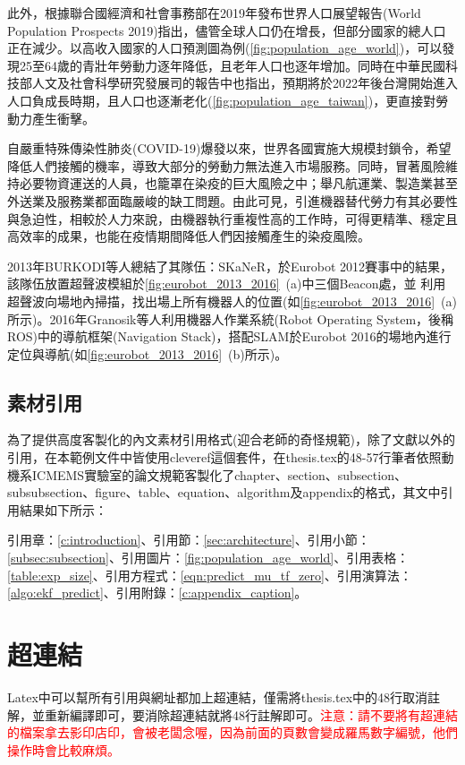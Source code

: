 此外，根據聯合國經濟和社會事務部在2019年發布世界人口展望報告(World Population Prospects 2019)\cite{nations2019world}指出，儘管全球人口仍在增長，但部分國家的總人口正在減少。以高收入國家的人口預測圖為例(\cref{fig:population_age_world})，可以發現25至64歲的青壯年勞動力逐年降低，且老年人口也逐年增加。同時在中華民國科技部人文及社會科學研究發展司的報告中也指出\cite{人文與社科簡訊_人口老化}，預期將於2022年後台灣開始進入人口負成長時期，且人口也逐漸老化(\cref{fig:population_age_taiwan})，更直接對勞動力產生衝擊。

自嚴重特殊傳染性肺炎(COVID-19)爆發以來，世界各國實施大規模封鎖令，希望降低人們接觸的機率，導致大部分的勞動力無法進入市場服務。同時，冒著風險維持必要物資運送的人員，也籠罩在染疫的巨大風險之中；舉凡航運業、製造業甚至外送業及服務業都面臨嚴峻的缺工問題。由此可見，引進機器替代勞力有其必要性與急迫性，相較於人力來說，由機器執行重複性高的工作時，可得更精準、穩定且高效率的成果，也能在疫情期間降低人們因接觸產生的染疫風險。

2013年BURKODI等人\cite{eurobot_ultrasound_2013}總結了其隊伍：SKaNeR，於Eurobot 2012賽事中的結果，該隊伍放置超聲波模組於\cref{fig:eurobot_2013_2016}~(a)中三個Beacon處，並
利用超聲波向場地內掃描，找出場上所有機器人的位置(如\cref{fig:eurobot_2013_2016}~(a)所示)。2016年Granosik等人\cite{eurobot_ros_2016}利用機器人作業系統(Robot Operating System，後稱ROS)\cite{ros_2009}中的導航框架(Navigation Stack)，搭配SLAM於Eurobot 2016的場地內進行定位與導航(如\cref{fig:eurobot_2013_2016}~(b)所示)。


\subsection{素材引用}

為了提供高度客製化的內文素材引用格式(迎合老師的奇怪規範)，除了文獻以外的引用，在本範例文件中皆使用cleveref這個套件，在thesis.tex的48-57行筆者依照動機系ICMEMS實驗室的論文規範客製化了chapter、section、subsection、subsubsection、figure、table、equation、algorithm及appendix的格式，其文中引用結果如下所示：

引用章：\cref{c:introduction}、引用節：\cref{sec:architecture}、引用小節：\cref{subsec:subsection}、引用圖片：\cref{fig:population_age_world}、引用表格：\cref{table:exp_size}、引用方程式：\cref{eqn:predict_mu_tf_zero}、引用演算法：\cref{algo:ekf_predict}、引用附錄：\cref{c:appendix_caption}。

\section{超連結}

Latex中可以幫所有引用與網址都加上超連結，僅需將thesis.tex中的48行取消註解，並重新編譯即可，要消除超連結就將48行註解即可。\textcolor{red}{注意：請不要將有超連結的檔案拿去影印店印，會被老闆念喔，因為前面的頁數會變成羅馬數字編號，他們操作時會比較麻煩。}
